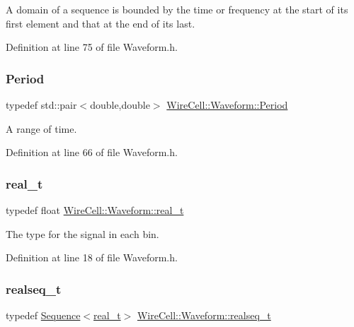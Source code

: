 A domain of a sequence is bounded by the time or frequency at the start of its first element and that at the end of its last. 

Definition at line 75 of file Waveform.\+h.

\mbox{\label{namespace_wire_cell_1_1_waveform_a3f830cc3d44a8f05e0a3fd5f23947467}} 
\subsubsection{\texorpdfstring{Period}{Period}}
{\footnotesize\ttfamily typedef std\+::pair$<$double,double$>$ \hyperlink{namespace_wire_cell_1_1_waveform_a3f830cc3d44a8f05e0a3fd5f23947467}{Wire\+Cell\+::\+Waveform\+::\+Period}}



A range of time. 



Definition at line 66 of file Waveform.\+h.

\mbox{\label{namespace_wire_cell_1_1_waveform_a47570354e4599d8387803188186aba1f}} 
\subsubsection{\texorpdfstring{real\+\_\+t}{real\_t}}
{\footnotesize\ttfamily typedef float \hyperlink{namespace_wire_cell_1_1_waveform_a47570354e4599d8387803188186aba1f}{Wire\+Cell\+::\+Waveform\+::real\+\_\+t}}



The type for the signal in each bin. 



Definition at line 18 of file Waveform.\+h.

\mbox{\label{namespace_wire_cell_1_1_waveform_a479175e541c8545e87cd8063b74b6956}} 
\subsubsection{\texorpdfstring{realseq\+\_\+t}{realseq\_t}}
{\footnotesize\ttfamily typedef \hyperlink{namespace_wire_cell_1_1_waveform_a1d2a1b672e3b220dcd64a994531de95d}{Sequence}$<$\hyperlink{namespace_wire_cell_1_1_waveform_a47570354e4599d8387803188186aba1f}{real\+\_\+t}$>$ \hyperlink{namespace_wire_cell_1_1_waveform_a479175e541c8545e87cd8063b74b6956}{Wire\+Cell\+::\+Waveform\+::realseq\+\_\+t}}



